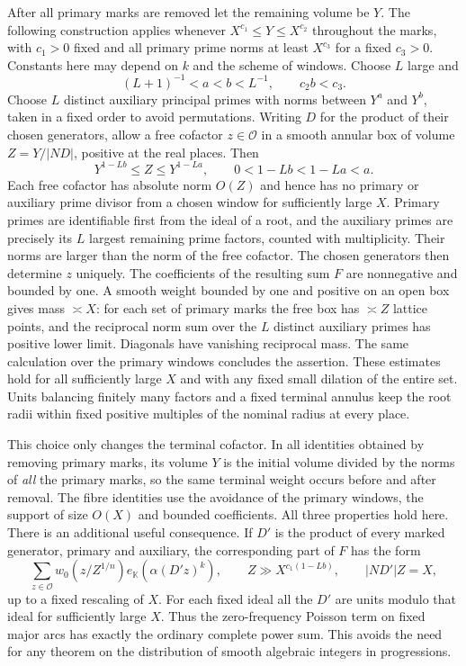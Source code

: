 \documentclass[11pt,letterpaper]{article}
\theoremstyle{definition}
\numberwithin{equation}{section}
\begin{document}
After all primary marks are removed let the remaining volume be $Y$.
The following construction applies whenever
$X^{c_1}\le Y\le X^{c_2}$ throughout the marks, with $c_1>0$ fixed
and all primary prime norms at least $X^{c_3}$ for a fixed $c_3>0$.
Constants here may depend on $k$ and the scheme of windows.
Choose $L$ large and
\[
 (L+1)^{-1}<a<b<L^{-1},\qquad c_2b<c_3 .
\]
Choose $L$ distinct auxiliary principal primes with norms between
$Y^a$ and $Y^b$, taken in a fixed order to avoid permutations.
Writing $D$ for the product of their chosen generators, allow a
free cofactor $z\in\mathcal O$ in a smooth annular box of volume
$Z=Y/|ND|$, positive at the real places. Then
\[
 Y^{1-Lb}\le Z\le Y^{1-La},\qquad 0<1-Lb<1-La<a.
\]
Each free cofactor has absolute norm $O(Z)$ and hence has no primary
or auxiliary prime divisor from a chosen window for sufficiently
large $X$. Primary primes are identifiable first from the ideal of
a root, and the auxiliary primes are precisely its $L$ largest
remaining prime factors, counted with multiplicity. Their norms are
larger than the norm of the free cofactor. The chosen generators then
determine $z$ uniquely. The coefficients of the resulting sum $F$
are nonnegative and bounded by one. A smooth weight bounded by one
and positive on an open box gives mass $\asymp X$: for each set of
primary marks the free box has $\asymp Z$ lattice points, and the
reciprocal norm sum over the $L$ distinct auxiliary primes has positive
lower limit. Diagonals have vanishing reciprocal mass. The same
calculation over the primary windows concludes the assertion. These
estimates hold for all sufficiently large $X$ and with any fixed
small dilation of the entire set. Units balancing finitely many
factors and a fixed terminal annulus keep the root radii within
fixed positive multiples of the nominal radius at every place.

This choice only changes the terminal cofactor. In all identities
obtained by removing primary marks, its volume $Y$ is the initial
volume divided by the norms of \emph{all} the primary marks, so
the same terminal weight occurs before and after removal. The fibre
identities use the avoidance of the primary windows, the support of
size $O(X)$ and bounded coefficients. All three properties hold here.
There is an additional useful consequence. If $D'$ is the product of
every marked generator, primary and auxiliary, the corresponding part
of $F$ has the form
\begin{equation}\label{eq:nf-terminal-form}
 \sum_{z\in\mathcal O}w_0(z/Z^{1/n})
                  e_{\mathbb K}(\alpha(D'z)^k),\qquad
 Z\gg X^{c_1(1-Lb)},\qquad |ND'|Z=X ,
\end{equation}
up to a fixed rescaling of $X$. For each fixed ideal all the $D'$
are units modulo that ideal for sufficiently large $X$. Thus the
zero-frequency Poisson term on fixed major arcs has exactly the
ordinary complete power sum. This avoids the need for any theorem on
the distribution of smooth algebraic integers in progressions.
\end{document}
